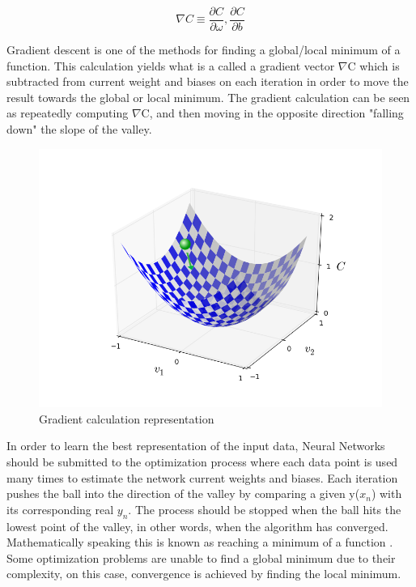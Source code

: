 $$\nabla C \equiv \frac{\partial C}{\partial \omega}, \frac{\partial C}{\partial b}$$

Gradient descent is one of the methods for finding a global/local minimum of a function. This calculation yields what is a called a gradient vector $\nabla$C which is subtracted from current weight and biases on each iteration in order to move the result towards the global or local minimum. The gradient calculation can be seen as repeatedly computing $\nabla$C, and then moving in the opposite direction "falling down" the slope of the valley.

\begin{figure}[!ht]
\centering
	\includegraphics[scale=0.3]{valley_with_ball.png}
\caption{Gradient calculation representation \cite{nielsen2016}}
\label{fig:net_change}
\end{figure}

In order to learn the best representation of the input data, Neural Networks should be submitted to the optimization process where each data point is used many times to estimate the network current weights and biases. Each iteration pushes the ball into the direction of the valley by comparing a given y($x_n$) with its corresponding real $y_n$. The process should be stopped when the ball hits the lowest point of the valley, in other words, when the algorithm has converged. Mathematically speaking this is known as reaching a minimum of a function \cite{nielsen2016}. Some optimization problems are unable to find a global minimum due to their complexity, on this case, convergence is achieved by finding the local minimum.

